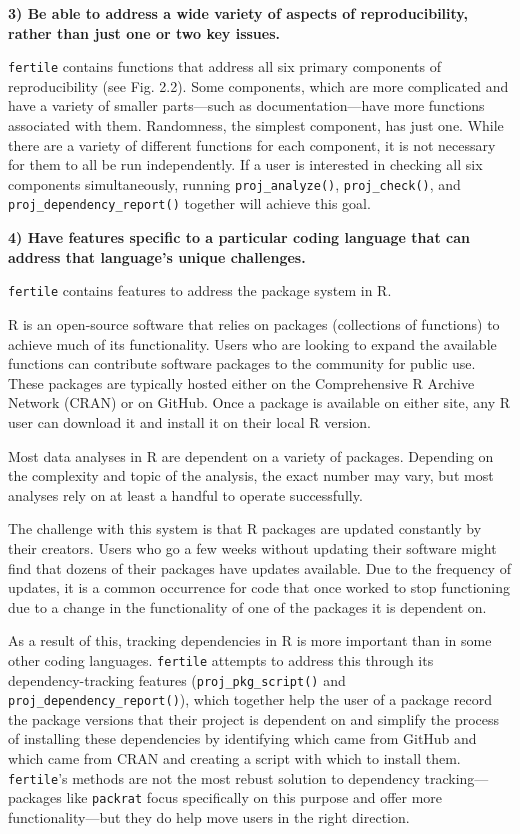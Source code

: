 \documentclass[12pt,twoside]{reedthesis}
\begin{document}
\textbf{3) Be able to address a wide variety of aspects of reproducibility, rather than just one or two key issues.}

\texttt{fertile} contains functions that address all six primary components of reproducibility (see Fig. 2.2). Some components, which are more complicated and have a variety of smaller parts---such as documentation---have more functions associated with them. Randomness, the simplest component, has just one. While there are a variety of different functions for each component, it is not necessary for them to all be run independently. If a user is interested in checking all six components simultaneously, running \texttt{proj\_analyze()}, \texttt{proj\_check()}, and \texttt{proj\_dependency\_report()} together will achieve this goal.

\textbf{4) Have features specific to a particular coding language that can address that language's unique challenges.}

\texttt{fertile} contains features to address the package system in R.

R is an open-source software that relies on packages (collections of functions) to achieve much of its functionality. Users who are looking to expand the available functions can contribute software packages to the community for public use. These packages are typically hosted either on the Comprehensive R Archive Network (CRAN) or on GitHub. Once a package is available on either site, any R user can download it and install it on their local R version.

Most data analyses in R are dependent on a variety of packages. Depending on the complexity and topic of the analysis, the exact number may vary, but most analyses rely on at least a handful to operate successfully.

The challenge with this system is that R packages are updated constantly by their creators. Users who go a few weeks without updating their software might find that dozens of their packages have updates available. Due to the frequency of updates, it is a common occurrence for code that once worked to stop functioning due to a change in the functionality of one of the packages it is dependent on.

As a result of this, tracking dependencies in R is more important than in some other coding languages. \texttt{fertile} attempts to address this through its dependency-tracking features (\texttt{proj\_pkg\_script()} and \texttt{proj\_dependency\_report()}), which together help the user of a package record the package versions that their project is dependent on and simplify the process of installing these dependencies by identifying which came from GitHub and which came from CRAN and creating a script with which to install them. \texttt{fertile}'s methods are not the most rebust solution to dependency tracking---packages like \texttt{packrat} focus specifically on this purpose and offer more functionality---but they do help move users in the right direction.
\end{document}
